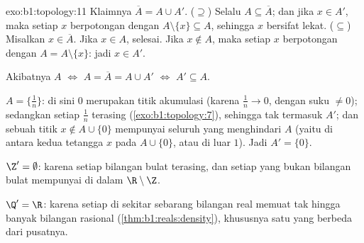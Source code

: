 \begin{solution}{exo:b1:topology:11}
Klaimnya $\overline A = A \cup A'$. ($\supseteq$) Selalu $A \subseteq \overline
A$; dan jika $x \in A'$, maka setiap  $x$ berpotongan dengan $A
\setminus \{x\} \subseteq A$, sehingga $x$ bersifat lekat. ($\subseteq$)
Misalkan $x \in \overline A$. Jika $x \in A$, selesai. Jika $x \notin A$, maka
setiap  $x$ berpotongan dengan $A = A \setminus \{x\}$: jadi $x \in
A'$.

Akibatnya $A$  $\iff$ $A = \overline A = A \cup A'$
$\iff$ $A' \subseteq A$.

$A = \{\frac 1n\}$: di sini $0$ merupakan titik akumulasi (karena $\frac 1n \to
0$, dengan suku $\neq 0$); sedangkan setiap $\frac 1n$ terasing
(\cref{exo:b1:topology:7}), sehingga tak termasuk $A'$; dan sebuah titik $x
\notin A \cup \{0\}$ mempunyai seluruh  yang menghindari $A$ (yaitu di antara
kedua tetangga $x$ pada $A \cup \{0\}$, atau di luar $1$).
Jadi $A' = \{0\}$.

$\Z' = \emptyset$: karena setiap bilangan bulat terasing, dan setiap yang bukan bilangan bulat
mempunyai  di dalam $\R \setminus \Z$.

$\Q' = \R$: karena setiap  di sekitar sebarang bilangan real memuat tak hingga
banyak bilangan rasional (\cref{thm:b1:reals:density}), khususnya satu
yang berbeda dari pusatnya.
\end{solution}

